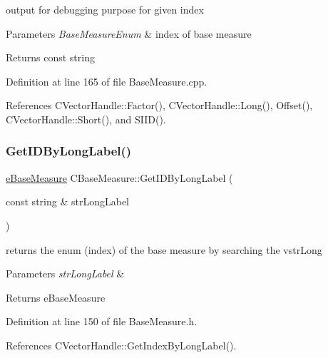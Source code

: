 output for debugging purpose for given index 


\begin{DoxyParams}{Parameters}
{\em Base\+Measure\+Enum} & index of base measure \\
\hline
\end{DoxyParams}
\begin{DoxyReturn}{Returns}
const string 
\end{DoxyReturn}


Definition at line 165 of file Base\+Measure.\+cpp.



References C\+Vector\+Handle\+::\+Factor(), C\+Vector\+Handle\+::\+Long(), Offset(), C\+Vector\+Handle\+::\+Short(), and S\+I\+I\+D().

\mbox{\label{classCBaseMeasure_a5c55d072ffe8e9b5fbe7713039987084}} 
\subsubsection{\texorpdfstring{Get\+I\+D\+By\+Long\+Label()}{GetIDByLongLabel()}}
{\footnotesize\ttfamily \hyperlink{BaseMeasure_8h_ac90e5164ccf1f0d648fba7e94b229a11}{e\+Base\+Measure} C\+Base\+Measure\+::\+Get\+I\+D\+By\+Long\+Label (\begin{DoxyParamCaption}\item[{const string \&}]{str\+Long\+Label }\end{DoxyParamCaption})\hspace{0.3cm}{\ttfamily [inline]}}



returns the enum (index) of the base measure by searching the vstr\+Long 


\begin{DoxyParams}{Parameters}
{\em str\+Long\+Label} & \\
\hline
\end{DoxyParams}
\begin{DoxyReturn}{Returns}
e\+Base\+Measure 
\end{DoxyReturn}


Definition at line 150 of file Base\+Measure.\+h.



References C\+Vector\+Handle\+::\+Get\+Index\+By\+Long\+Label().


